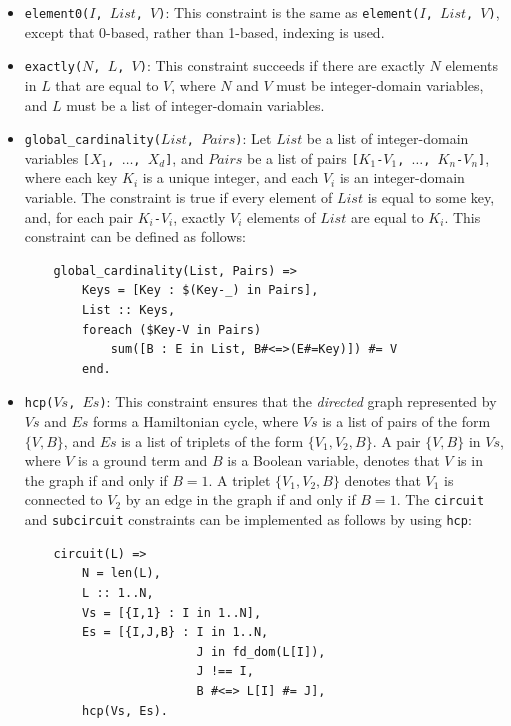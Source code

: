 \begin{itemize}
\item \texttt{element0($I$, $List$, $V$)}: This constraint is the same as \texttt{element($I$, $List$, $V$)}, except that 0-based, rather than 1-based, indexing is used.

\item \texttt{exactly($N$, $L$, $V$)}: This constraint succeeds if there are exactly $N$ elements in $L$ that are equal to $V$, where $N$ and $V$ must be integer-domain variables, and $L$ must be a list of integer-domain variables.

\item \texttt{global\_cardinality($List$, $Pairs$)}: Let $List$ be a list of integer-domain variables \texttt{[$X_1$, $\ldots$, $X_d$]}, and $Pairs$ be a list of pairs \texttt{[$K_1$-$V_1$, $\ldots$, $K_n$-$V_n$]}, where each key \texttt{$K_i$} is a unique integer, and each \texttt{$V_i$} is an integer-domain variable. The constraint is true if every element of $List$ is equal to some key, and, for each pair \texttt{$K_i$-$V_i$}, exactly \texttt{$V_i$} elements of $List$ are equal to \texttt{$K_i$}. This constraint can be defined as follows:
\begin{verbatim}
    global_cardinality(List, Pairs) =>
        Keys = [Key : $(Key-_) in Pairs],
        List :: Keys,
        foreach ($Key-V in Pairs) 
            sum([B : E in List, B#<=>(E#=Key)]) #= V
        end.
\end{verbatim}

\item \texttt{hcp($Vs$, $Es$)}: This constraint ensures that the \textit{directed} graph represented by $Vs$ and $Es$ forms a Hamiltonian cycle, where $Vs$ is a list of pairs of the form $\{V,B\}$, and $Es$ is a list of triplets of the form $\{V_1,V_2,B\}$. A pair $\{V,B\}$ in $Vs$, where $V$ is a ground term and $B$ is a Boolean variable, denotes that $V$ is in the graph if and only if $B = 1$. A triplet $\{V_1,V_2,B\}$ denotes that $V_1$ is connected to $V_2$  by an edge in the graph if and only if $B = 1$. The \texttt{circuit} and \texttt{subcircuit} constraints can be implemented as follows by using \texttt{hcp}:
\begin{verbatim}
    circuit(L) =>
        N = len(L),
        L :: 1..N,
        Vs = [{I,1} : I in 1..N],
        Es = [{I,J,B} : I in 1..N, 
                        J in fd_dom(L[I]), 
                        J !== I, 
                        B #<=> L[I] #= J],
        hcp(Vs, Es).


\end{verbatim}
\end{itemize}
